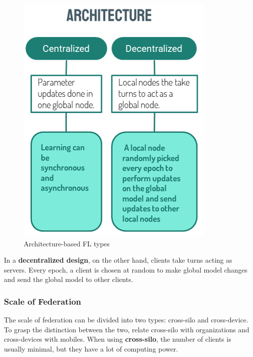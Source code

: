 \begin{figure}[H]
\centering
\includegraphics[scale=0.5]{img/fl_architecture.png}
\caption{Architecture-based FL types}
\label{fig:fl_architecture}
\end{figure}


In a \textbf{decentralized design}, on the other hand, clients take turns acting as servers. Every epoch, a client is chosen at random to make global model changes and send the global model to other clients.

\subsubsection{Scale of Federation}

The scale of federation can be divided into two types: cross-silo and cross-device. To grasp the distinction between the two, relate cross-silo with organizations and cross-devices with mobiles. When using \textbf{cross-silo}, the number of clients is usually minimal, but they have a lot of computing power. 

